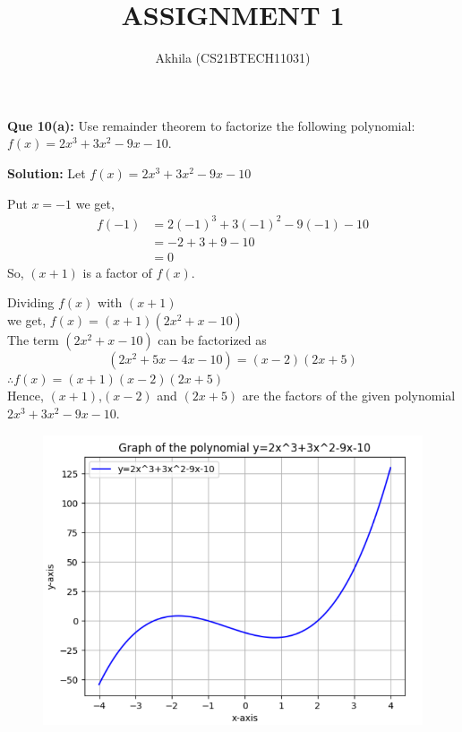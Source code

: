 \documentclass[12pt,twocolumn]{article}
\begin{document}
\large \title{ASSIGNMENT 1}
\author{Akhila (CS21BTECH11031)}
\maketitle
{\Large \textbf  {Que 10(a): }}
Use remainder theorem to factorize the following polynomial:\\
$f(x)=2x^3+3x^2-9x-10$.\\
\vspace{2mm}

{\Large \textbf  {Solution:}}
Let $f(x)=2x^3+3x^2-9x-10$ 

Put $x=-1$ we get,
\begin{align*}
f(-1) & =2(-1)^3+3(-1)^2-9(-1)-10\\
      & =-2+3+9-10\\ 
      & =0
\end{align*}
So, $(x+1)$ is a factor of $f(x)$.

Dividing $f(x)$ with $(x+1)$\\ 
 we get,
        $f(x)=(x+1)(2x^2+x-10)$\\
The term $(2x^2+x-10)$ can be factorized as
\begin{equation*}
    (2x^2+5x-4x-10)=(x-2)(2x+5)
\end{equation*}
\vspace{5mm}
$\therefore f(x)=(x+1)(x-2)(2x+5)$\\
Hence,  $(x+1)$,$(x-2)$ and $(2x+5)$  are the factors of the given polynomial\\
$2x^3+3x^2-9x-10$.
\begin{figure}
\centering
    \includegraphics[scale=0.5]{plot.png}
\end{figure}
\end{document}
